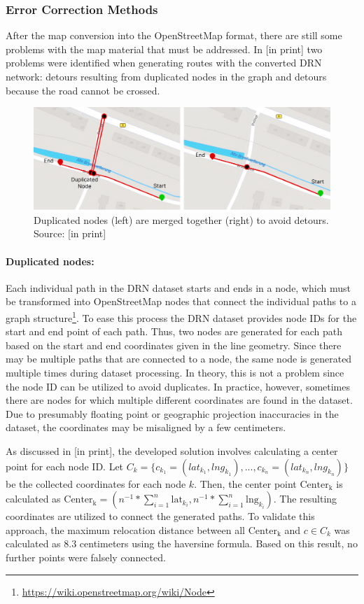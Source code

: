 \subsubsection{Error Correction Methods}

After the map conversion into the OpenStreetMap format, there are still some problems with the map material that must be addressed. In [in print] two problems were identified when generating routes with the converted DRN network: detours resulting from duplicated nodes in the graph and detours because the road cannot be crossed.

\begin{figure}[htbp]
\centering
\includegraphics[width=\linewidth]{images/node-merging.png}
\caption{Duplicated nodes (left) are merged together (right) to avoid detours. Source: [in print]}
\label{fig:node-merging}
\end{figure}

\paragraph{Duplicated nodes:} Each individual path in the DRN dataset starts and ends in a node, which must be transformed into OpenStreetMap nodes that connect the individual paths to a graph structure\footnote{\url{https://wiki.openstreetmap.org/wiki/Node}}. To ease this process the DRN dataset provides node IDs for the start and end point of each path. Thus, two nodes are generated for each path based on the start and end coordinates given in the line geometry. Since there may be multiple paths that are connected to a node, the same node is generated multiple times during dataset processing. In theory, this is not a problem since the node ID can be utilized to avoid duplicates. In practice, however, sometimes there are nodes for which multiple different coordinates are found in the dataset. Due to presumably floating point or geographic projection inaccuracies in the dataset, the coordinates may be misaligned by a few centimeters.

As discussed in [in print], the developed solution involves calculating a center point for each node ID. Let $C_k = \{c_{k_1} = (lat_{k_1}, lng_{k_1}), \text{...} , c_{k_n} = (lat_{k_n}, lng_{k_n})\}$ be the collected coordinates for each node $k$. Then, the center point $\text{Center}_{\text{k}}$ is calculated as $\text{Center}_{\text{k}} = \left(n^{-1} * {\sum_{i=1}^{n} \text{{lat}}_{k_i}}, {n^{-1} * \sum_{i=1}^{n} \text{{lng}}_{k_i}}\right)$. The resulting coordinates are utilized to connect the generated paths. To validate this approach, the maximum relocation distance between all $\text{Center}_{\text{k}}$ and $c \in C_k$ was calculated as 8.3 centimeters using the haversine formula. Based on this result, no further points were falsely connected.

